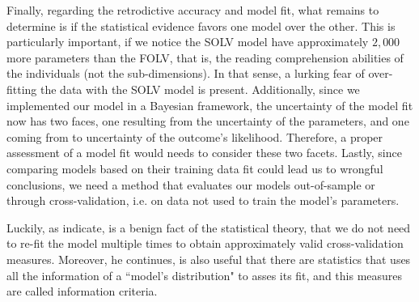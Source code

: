 Finally, regarding the retrodictive accuracy and model fit, what remains to determine is if the statistical evidence favors one model over the other. This is particularly important, if we notice the SOLV model have approximately $2,000$ more parameters than the FOLV, that is, the reading comprehension abilities of the individuals (not the sub-dimensions). In that sense, a lurking fear of over-fitting the data with the SOLV model is present. Additionally, since we implemented our model in a Bayesian framework, the uncertainty of the model fit now has two faces, one resulting from the uncertainty of the parameters, and one coming from to uncertainty of the outcome's likelihood. Therefore, a proper assessment of a model fit would needs to consider these two facets. Lastly, since comparing models based on their training data fit could lead us to wrongful conclusions, we need a method that evaluates our models out-of-sample or through cross-validation, i.e. on data not used to train the model's parameters.

Luckily, as \citet{McElreath_2020} indicate, is a benign fact of the statistical theory, that we do not need to re-fit the model multiple times to obtain approximately valid cross-validation measures. Moreover, he continues, is also useful that there are statistics that uses all the information of a ``model's distribution" to asses its fit, and this measures are called information criteria.

